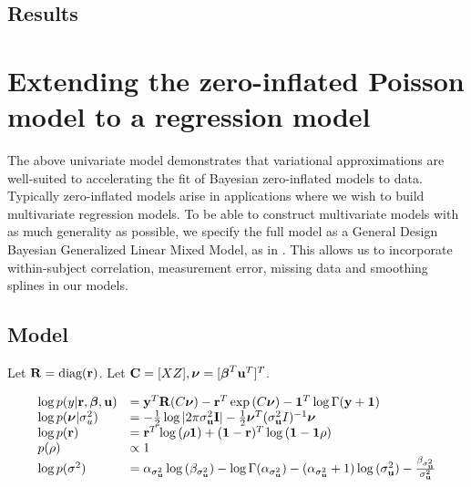 \documentclass{amsart}
\begin{document}
\subsection{Results}

\section{Extending the zero-inflated Poisson model to a regression model}
The above univariate model demonstrates that variational approximations are well-suited
to accelerating the fit of Bayesian zero-inflated models to data. Typically zero-inflated
models arise in applications where we wish to build multivariate regression models. To be able to
construct multivariate models with as much generality as possible, we specify the full
model as a General Design Bayesian Generalized Linear Mixed Model, as in \cite{zhao06}.
This allows us to incorporate within-subject correlation, measurement error, missing data
and smoothing splines in our models.



\subsection{Model}
Let ${\bf R} = \text{diag}{({\bf r})}$. Let ${\bf C} = [X Z], {\boldsymbol \nu} = [{\boldsymbol \beta}^T {\bf u}^T]^T$.

$$
\begin{array}{ll}
\log{p(y|{\bf r}, {\boldsymbol\beta}, {\bf u})} &= {\bf y}^T {\bf R} (C{\boldsymbol \nu}) - {\bf r}^T \exp{(C{\boldsymbol\nu})} - {\bf 1}^T \log{\Gamma{({\bf y}+ {\bf1})}} \\
\log{p({\boldsymbol\nu}|\sigma_{u}^2)} &= - {\frac{1}{2}} \log{|2\pi \sigma_{{\bf u}}^2 {\bf I}|} - {\frac{1}{2}} {\boldsymbol \nu}^T(\sigma_{{\bf u}}^2 I)^{-1} {\boldsymbol \nu} \\
\log{p({\bf r})} &= {\bf r}^T \log{(\rho {\bf1})} + ({\bf 1} - {\bf r})^T\log{({\bf1}- {\bf1}\rho)} \\
p(\rho) &\propto 1 \\
\log{p(\sigma^2)} &= \alpha_{\sigma_{\bf u}^2} \log{(\beta_{\sigma_{\bf u}^2})} - \log{\Gamma{(\alpha_{\sigma_{\bf u}^2})}} - (\alpha_{\sigma_{\bf u}^2} + 1) \log{(\sigma_{{\bf u}}^2)} - \frac{\beta_{\sigma_{\bf u}^2}}{\sigma_{{\bf u}}^2}\\
\end{array}
$$
\end{document}
